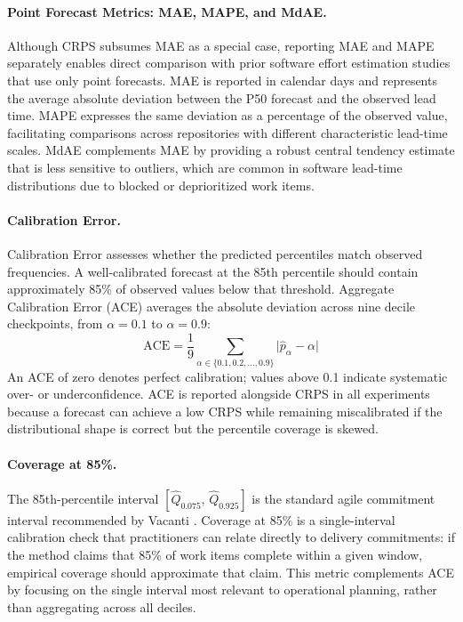 \paragraph{Point Forecast Metrics: MAE, MAPE, and MdAE.}
Although CRPS subsumes MAE as a special case, reporting MAE and MAPE
separately enables direct comparison with prior software effort
estimation studies that use only point forecasts.
MAE is reported in calendar days and represents the average absolute
deviation between the P50 forecast and the observed lead time.
MAPE expresses the same deviation as a percentage of the observed
value, facilitating comparisons across repositories with different
characteristic lead-time scales.
MdAE complements MAE by providing a robust central tendency estimate
that is less sensitive to outliers, which are common in software
lead-time distributions due to blocked or deprioritized work items.
 
\paragraph{Calibration Error.}
Calibration Error assesses whether the predicted percentiles match
observed frequencies.
A well-calibrated forecast at the 85th percentile should contain
approximately 85\% of observed values below that threshold.
Aggregate Calibration Error (ACE) averages the absolute deviation
across nine decile checkpoints, from $\alpha = 0.1$ to
$\alpha = 0.9$:
\begin{equation}
  \mathrm{ACE} = \frac{1}{9}
    \sum_{\alpha \in \{0.1, 0.2, \ldots, 0.9\}}
    \lvert \hat{p}_\alpha - \alpha \rvert
\end{equation}
An ACE of zero denotes perfect calibration; values above 0.1 indicate
systematic over- or underconfidence.
ACE is reported alongside CRPS in all experiments because a forecast
can achieve a low CRPS while remaining miscalibrated if the
distributional shape is correct but the percentile coverage is
skewed.
 
\paragraph{Coverage at 85\%.}
The 85th-percentile interval $[\hat{Q}_{0.075},\,\hat{Q}_{0.925}]$
is the standard agile commitment interval recommended by Vacanti
\cite{vacanti2015}.
Coverage at 85\% is a single-interval calibration check that
practitioners can relate directly to delivery commitments: if the
method claims that 85\% of work items complete within a given
window, empirical coverage should approximate that claim.
This metric complements ACE by focusing on the single interval most
relevant to operational planning, rather than aggregating across
all deciles.
 
